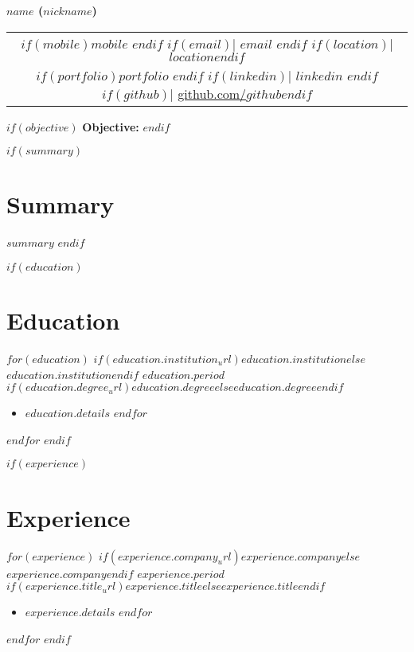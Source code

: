 \documentclass[10.5pt,a4paper]{article}
\newcommand{\daterange}[1]{\textbf{#1}}
\begin{document}
\begin{center}
	{\LARGE \textbf{$name$ ($nickname$)}}\\
	\begin{tabular}{@{}c@{}}
		$if(mobile)$$mobile$ $endif$
		$if(email)$| \href{mailto:$email$}{$email$} $endif$
		$if(location)$| $location$$endif$ \\
			$if(portfolio)$\href{https://$portfolio$}{$portfolio$} $endif$
		$if(linkedin)$| \href{https://$linkedin$}{$linkedin$} $endif$
		$if(github)$| \href{https://github.com/$github$}{github.com/$github$}$endif$
	\end{tabular}
\end{center}

$if(objective)$
{\large\bfseries\color{sectioncolor}Objective:} 
$endif$

$if(summary)$
\section*{Summary}
$summary$
$endif$

$if(education)$
\section*{Education}
$for(education)$
\noindent\textbf{$if(education.institution_url)$\href{$education.institution_url$}{$education.institution$}$else$$education.institution$$endif$} \hfill \daterange{$education.period$}\\
$if(education.degree_url)$\href{$education.degree_url$}{$education.degree$}$else$$education.degree$$endif$
\begin{itemize}
	$for(education.details)$
	\item $education.details$
	      $endfor$
\end{itemize}
\vspace{-0.1cm}
$endfor$
$endif$

$if(experience)$
\section*{Experience}
$for(experience)$
\noindent\textbf{$if(experience.company_url)$\href{$experience.company_url$}{$experience.company$}$else$$experience.company$$endif$} \hfill \daterange{$experience.period$}\\
\textit{$if(experience.title_url)$\href{$experience.title_url$}{$experience.title$}$else$$experience.title$$endif$}
\begin{itemize}
	$for(experience.details)$
	\item $experience.details$
	      $endfor$
\end{itemize}
\vspace{-0.1cm}
$endfor$
$endif$
\end{document}
